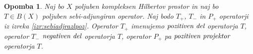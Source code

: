 \documentclass[12pt,a4paper,oneside,fleqn,openany]{book}
\newtheorem{opomba}[izrek]{Opomba}
\newcommand{\pojem}[1]{\ensuremath{\emph{#1}}}
\begin{document}
\begin{opomba}
	\label{opomb:pozinnegdelsebiadj} Naj bo $X$ poljuben kompleksen Hilbertov prostor in naj bo $T\in B(X)$ poljuben sebi-adjungiran operator. Naj bodo $T_+$, $T_-$ in $P_+$ operatorji iz izreka \ref{izr:sebiadjrazlpoz}. Operator $T_+$ imenujemo \pojem{pozitiven del} operatorja $T$, operator $T_-$ \pojem{negativen del} operatorja $T$, operator $P_+$ pa \pojem{pozitiven projektor} operatorja $T$.
\end{opomba}
%
%
%
%

%
% 
%
\end{document}
